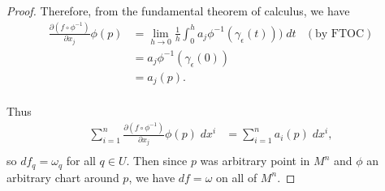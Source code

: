 \documentclass{article}
\begin{document}
\begin{enumerate}[label={\bf Q\arabic*:}]
\begin{enumerate}
\begin{proof}
          Therefore, from the fundamental theorem of calculus, we have
          \begin{align*}
            \frac{\partial(f\circ\phi^{-1})}{\partial x_j}\phi(p)
              &=\lim_{h\rightarrow0} \frac{1}{h} \int^h_0
              a_j\phi^{-1}(\gamma_\epsilon(t)))\; dt &(\text{by FTOC}) \\
              &=a_j\phi^{-1}(\gamma_\epsilon(0)) \\
              &=a_j(p). \\
          \end{align*}

          Thus
          \begin{align*}
            \sum_{i=1}^n \frac{\partial(f\circ\phi^{-1})}{\partial
              x_j}\phi(p)\; dx^i &=\sum_{i=1}^n a_i(p)\; dx^i, \\
          \end{align*}
          so $df_{q}=\omega_q$ for all $q\in U$. Then since $p$ was
          arbitrary point in $M^n$ and $\phi$ an arbitrary chart around
          $p$, we have $df=\omega$ on all of $M^n$.
        \end{proof}
    \end{enumerate}
\end{enumerate}
\end{document}
